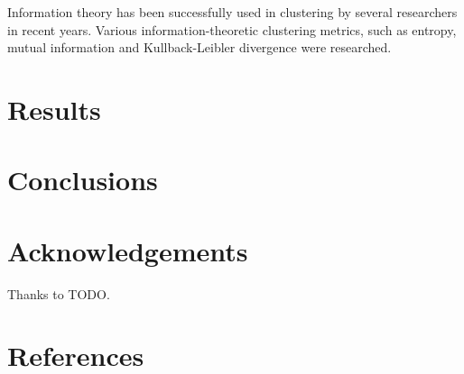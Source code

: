 \documentclass[conference]{IEEEtran}
\begin{document}
Information theory has been successfully used in clustering by several researchers in recent years.
Various information-theoretic clustering metrics, such as entropy, mutual information and
Kullback-Leibler divergence were researched.

\section{Results}

\section{Conclusions}

\section*{Acknowledgements}
Thanks to TODO.

\section*{References}
\end{document}
